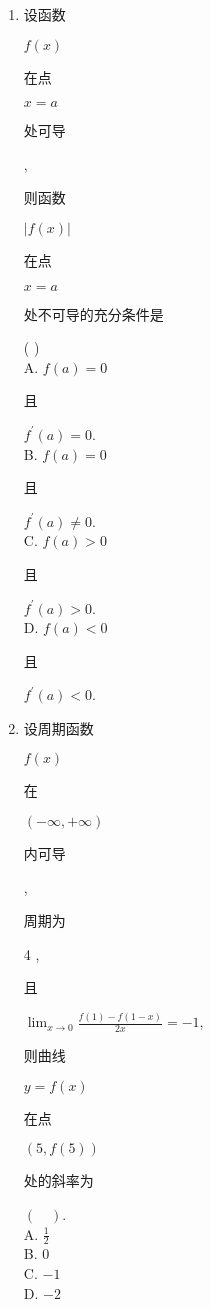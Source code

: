 \documentclass[10pt]{article}
\begin{document}
\begin{enumerate}
  \item \begin{CJK}{UTF8}{mj}设函数\end{CJK} $f(x)$ \begin{CJK}{UTF8}{mj}在点\end{CJK} $x=a$ \begin{CJK}{UTF8}{mj}处可导\end{CJK}, \begin{CJK}{UTF8}{mj}则函数\end{CJK} $|f(x)|$ \begin{CJK}{UTF8}{mj}在点\end{CJK} $x=a$ \begin{CJK}{UTF8}{mj}处不可导的充分条件是\end{CJK} ( )\\
A. $f(a)=0$ \begin{CJK}{UTF8}{mj}且\end{CJK} $f^{\prime}(a)=0$.\\
B. $f(a)=0$ \begin{CJK}{UTF8}{mj}且\end{CJK} $f^{\prime}(a) \neq 0$.\\
C. $f(a)>0$ \begin{CJK}{UTF8}{mj}且\end{CJK} $f^{\prime}(a)>0$.\\
D. $f(a)<0$ \begin{CJK}{UTF8}{mj}且\end{CJK} $f^{\prime}(a)<0$.

  \item \begin{CJK}{UTF8}{mj}设周期函数\end{CJK} $f(x)$ \begin{CJK}{UTF8}{mj}在\end{CJK} $(-\infty,+\infty)$ \begin{CJK}{UTF8}{mj}内可导\end{CJK}, \begin{CJK}{UTF8}{mj}周期为\end{CJK} 4 , \begin{CJK}{UTF8}{mj}且\end{CJK} $\lim _{x \rightarrow 0} \frac{f(1)-f(1-x)}{2 x}=-1$, \begin{CJK}{UTF8}{mj}则曲线\end{CJK} $y=f(x)$ \begin{CJK}{UTF8}{mj}在点\end{CJK} $(5, f(5))$ \begin{CJK}{UTF8}{mj}处的斜率为\end{CJK} $(\quad)$.\\
A. $\frac{1}{2}$\\
B. 0\\
C. $-1$\\
D. $-2$


\end{enumerate}
\end{document}
